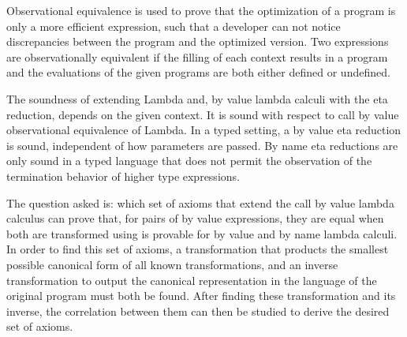 
Observational equivalence is used to prove that the optimization of a program is only a more efficient expression, such that a developer can not notice discrepancies between the program and the optimized version. Two expressions are observationally equivalent if the filling of each context results in a program and the evaluations of the given programs are both either defined or undefined.

The soundness of extending Lambda and, by value lambda calculi with the eta reduction, depends on the given context. It is sound with respect to call by value observational equivalence of Lambda. In a typed setting, a by value eta reduction is sound, independent of how parameters are passed. By name eta reductions are only sound in a typed language that does not permit the observation of the termination behavior of higher type expressions.


The question asked is: which set of axioms that extend the call by value lambda calculus can prove that, for pairs of by value expressions, they are equal when both are transformed using \cps is provable for by value and by name lambda calculi.  In order to find this set of axioms, a \cps transformation that products the smallest possible canonical form of all known \cps transformations, and an inverse \cps transformation to output the canonical representation in the language of the original program must both be found.  After finding these \cps transformation and its inverse, the correlation between them can then be studied to derive the desired set of axioms.

